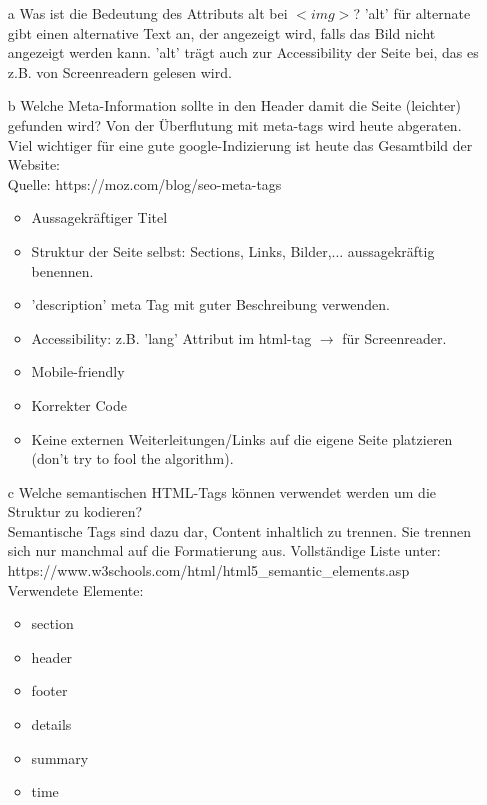 \documentclass[12pt, a4paper]{report}
\begin{document}
\begin{itemize}
  \item[a] Was ist die Bedeutung des Attributs alt bei $<img>$?
  'alt' für alternate gibt einen alternative Text an, der angezeigt wird, falls das Bild nicht
  angezeigt werden kann. 'alt' trägt auch zur Accessibility der Seite bei, das es z.B. von Screenreadern
  gelesen wird.
  \item[b] Welche Meta-Information sollte in den Header damit die Seite (leichter) gefunden wird?
  Von der Überflutung mit meta-tags wird heute abgeraten. Viel wichtiger für eine gute google-Indizierung ist
  heute das Gesamtbild der Website:\\
  Quelle: https://moz.com/blog/seo-meta-tags
  \begin{itemize}
  	\item Aussagekräftiger Titel
  	\item Struktur der Seite selbst: Sections, Links, Bilder,... aussagekräftig benennen.
  	\item 'description' meta Tag mit guter Beschreibung verwenden.
  	\item Accessibility: z.B. 'lang' Attribut im html-tag $\rightarrow$ für Screenreader.
  	\item Mobile-friendly
  	\item Korrekter Code
  	\item Keine externen Weiterleitungen/Links auf die eigene Seite platzieren (don't try to fool the algorithm).
  \end{itemize}
  \item[c] Welche semantischen HTML-Tags können verwendet werden um die Struktur zu kodieren?\\
  Semantische Tags sind dazu dar, Content inhaltlich zu trennen. Sie trennen sich nur manchmal auf die
  Formatierung aus.
  Vollständige Liste unter:\\
  https://www.w3schools.com/html/html5\_semantic\_elements.asp\\
  Verwendete Elemente:\\
  \begin{itemize}
  	\item section
  	\item header
  	\item footer
  	\item details
  	\item summary
  	\item time
  \end{itemize}
\end{itemize}
\end{document}
